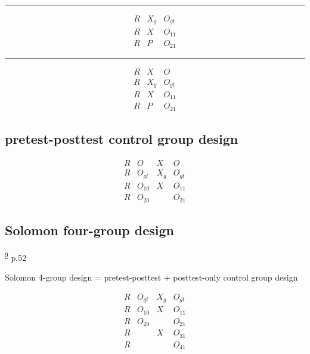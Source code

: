 \documentclass[
]{book}
\theoremstyle{definition}
\theoremstyle{definition}
\theoremstyle{definition}
\theoremstyle{definition}
\theoremstyle{remark}
\begin{document}
\begin{center}\rule{0.5\linewidth}{0.5pt}\end{center}

\[
\begin{array}{ccc}
R & X_{g} & O_{gt}\\
R & X & O_{11}\\
R & P & O_{21}
\end{array}
\]

\begin{center}\rule{0.5\linewidth}{0.5pt}\end{center}

\[
\begin{array}{ccc}
R & X & O\\
R & X_{g} & O_{gt}\\
R & X & O_{11}\\
R & P & O_{21}
\end{array}
\]

\hypertarget{pretest-posttest-control-group-design}{%
\subsection{pretest-posttest control group design}\label{pretest-posttest-control-group-design}}

\[
\begin{array}{cccc}
R & O & X & O\\
R & O_{gt} & X_{g} & O_{gt}\\
R & O_{10} & X & O_{11}\\
R & O_{20} &  & O_{21}
\end{array}
\]

\hypertarget{solomon-four-group-design}{%
\subsection{Solomon four-group design}\label{solomon-four-group-design}}

\textsuperscript{\protect\hyperlink{ref-hu2022}{9}} p.52

Solomon 4-group design = pretest-posttest + posttest-only control group design

\[
\begin{array}{cccc}
R & O_{gt} & X_{g} & O_{gt}\\
R & O_{10} & X & O_{11}\\
R & O_{20} &  & O_{21}\\
R &  & X & O_{31}\\
R &  &  & O_{41}
\end{array}
\]
\end{document}
